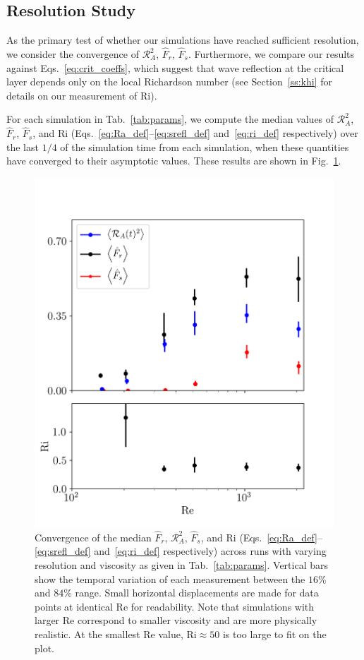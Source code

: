 \documentclass[
        fleqn,
        usenatbib,
        referee,
    ]{mnras}
\begin{document}
\subsection{Resolution Study}\label{ss:convergence}

As the primary test of whether our simulations have reached sufficient
resolution, we consider the convergence of $\mathcal{R}_A^2$, $\hat{F}_r$,
$\hat{F}_s$. Furthermore, we compare our results against
Eqs.~\eqref{eq:crit_coeffs}, which suggest that wave reflection at the critical
layer depends only on the local Richardson number (see Section~\ref{ss:khi} for
details on our measurement of $\mathrm{Ri}$).

For each simulation in Tab.~\ref{tab:params}, we compute the median values of
$\mathcal{R}_A^2$, $\hat{F}_r$, $\hat{F}_s$, and $\mathrm{Ri}$
(Eqs.~\eqref{eq:Ra_def}--\eqref{eq:srefl_def} and~\eqref{eq:ri_def}
respectively) over the last $1/4$ of the simulation time from each simulation,
when these quantities have converged to their asymptotic values. These results
are shown in Fig.~\ref{fig:agg}.

\begin{figure}
    \centering
    \includegraphics[width=0.9\columnwidth]{plots/agg.png}
    \caption{Convergence of the median $\hat{F}_r$, $\mathcal{R}_A^2$,
    $\hat{F}_s$, and $\mathrm{Ri}$ (Eqs.~\eqref{eq:Ra_def}--\eqref{eq:srefl_def}
    and~\eqref{eq:ri_def} respectively) across runs with varying resolution and
    viscosity as given in Tab.~\ref{tab:params}. Vertical bars show the temporal
    variation of each measurement between the $16\%$ and $84\%$ range. Small
    horizontal displacements are made for data points at identical $\mathrm{Re}$
    for readability. Note that simulations with larger $\mathrm{Re}$ correspond
    to smaller viscosity and are more physically realistic. At the smallest
    $\mathrm{Re}$ value, $\mathrm{Ri} \approx 50$ is too large to fit on the
    plot.}\label{fig:agg}
\end{figure}
\end{document}
